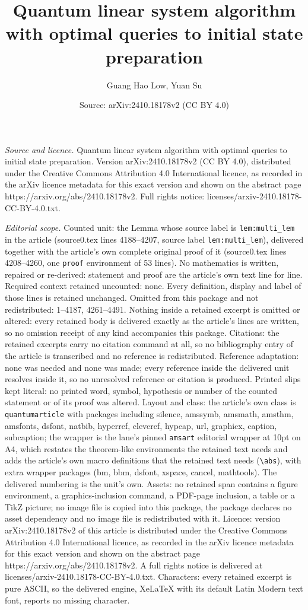 \documentclass[10pt,a4paper]{amsart}
\title[Quantum linear system algorithm with optimal queries to init]{Quantum linear system algorithm with optimal queries to initial state preparation}
\author{Guang Hao Low, Yuan Su}
\date{Source: arXiv:2410.18178v2 (CC BY 4.0)}
\begin{document}
\maketitle

\noindent\emph{Source and licence.} Quantum linear system algorithm with optimal queries to initial state preparation. Version arXiv:2410.18178v2 (CC BY 4.0), distributed under the Creative Commons Attribution 4.0 International licence, as recorded in the arXiv licence metadata for this exact version and shown on the abstract page https://arxiv.org/abs/2410.18178v2. Full rights notice: licenses/arxiv-2410.18178-CC-BY-4.0.txt.\par\smallskip

\noindent\textit{Editorial scope.} Counted unit: the Lemma whose source label is \texttt{lem:multi\_lem} in the article (source0.tex lines 4188--4207, source label \texttt{lem:multi\_lem}), delivered together with the article's own complete original proof of it (source0.tex lines 4208--4260, one \texttt{proof} environment of 53 lines). No mathematics is written, repaired or re-derived: statement and proof are the article's own text line for line. Required context retained uncounted: none. Every definition, display and label of those lines is retained unchanged. Omitted from this package and not redistributed: 1--4187, 4261--4491. Nothing inside a retained excerpt is omitted or altered: every retained body is delivered exactly as the article's lines are written, so no omission receipt of any kind accompanies this package. Citations: the retained excerpts carry no citation command at all, so no bibliography entry of the article is transcribed and no reference is redistributed. Reference adaptation: none was needed and none was made; every reference inside the delivered unit resolves inside it, so no unresolved reference or citation is produced. Printed slips kept literal: no printed word, symbol, hypothesis or number of the counted statement or of its proof was altered. Layout and class: the article's own class is \texttt{quantumarticle} with packages including silence, amssymb, amsmath, amsthm, amsfonts, dsfont, natbib, hyperref, cleveref, hypcap, url, graphicx, caption, subcaption; the wrapper is the lane's pinned \texttt{amsart} editorial wrapper at 10pt on A4, which restates the theorem-like environments the retained text needs and adds the article's own macro definitions that the retained text needs (\texttt{\textbackslash abs}), with extra wrapper packages (bm, bbm, dsfont, xspace, cancel, mathtools). The delivered numbering is the unit's own. Assets: no retained span contains a figure environment, a graphics-inclusion command, a PDF-page inclusion, a table or a TikZ picture; no image file is copied into this package, the package declares no asset dependency and no image file is redistributed with it. Licence: version arXiv:2410.18178v2 of this article is distributed under the Creative Commons Attribution 4.0 International licence, as recorded in the arXiv licence metadata for this exact version and shown on the abstract page https://arxiv.org/abs/2410.18178v2. A full rights notice is delivered at licenses/arxiv-2410.18178-CC-BY-4.0.txt. Characters: every retained excerpt is pure ASCII, so the delivered engine, XeLaTeX with its default Latin Modern text font, reports no missing character.
\end{document}
